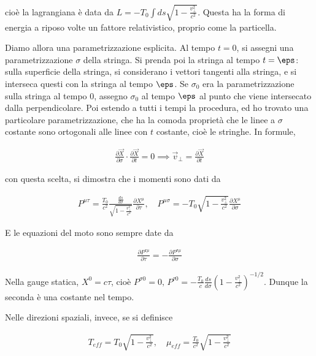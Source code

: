 \documentclass{report}
\begin{document}
cioè la lagrangiana è data da \(L = -T_0\int ds \sqrt{1 - \frac{v_\perp^2}{c^2}}\). Questa ha la forma di energia a riposo volte un fattore relativistico, proprio come la particella. 

Diamo allora una parametrizzazione esplicita. Al tempo \(t=0\), si assegni una parametrizzazione \(\sigma\) della stringa. Si prenda poi la stringa al tempo \(t = \eps\): sulla superficie della stringa, si considerano i vettori tangenti alla stringa, e si interseca questi con la stringa al tempo \(\eps\). Se \(\sigma_0\) era la parametrizzazione sulla stringa al tempo 0, assegno \(\sigma_0\) al tempo \(\eps\) al punto che viene intersecato dalla perpendicolare. Poi estendo a tutti i tempi la procedura, ed ho trovato una particolare parametrizzazione, che ha la comoda proprietà che le linee a \(\sigma\) costante sono ortogonali alle linee con \(t\) costante, cioè le stringhe. In formule, 

\begin{align}
    \frac{\partial \vec{X}}{\partial \sigma}\cdot \frac{\partial \vec{X}}{\partial t} = 0 \implies \vec{v}_\perp = \frac{\partial \vec{X}}{\partial t}
\end{align}

con questa scelta, si dimostra che i momenti sono dati da 

\begin{align}
    P^{\mu \tau } = \frac{T_0}{c^2}\frac{\frac{ds}{d\sigma}}{\sqrt{1 - \frac{v_\perp^2}{c^2}}}\frac{\partial X^\mu}{\partial \tau}, \quad P^{\mu\sigma} = -T_0\sqrt{1 - \frac{v_\perp^2}{c^2}}\frac{\partial X^\mu}{\partial \sigma}
\end{align}

E le equazioni del moto sono sempre date da 

\begin{align}
    \frac{\partial P^{\tau \mu}}{\partial \tau} = - \frac{\partial P^{\sigma\mu}}{\partial \sigma}
\end{align}

Nella gauge statica, \(X^0 = c\tau \), cioè \(P^{\sigma 0} = 0, \, P^{\tau 0} = -\frac{T_0}{c}\frac{ds}{d\sigma}\left(1 - \frac{v_\perp^2}{c^2}\right)^{-1/2}\). Dunque la seconda è una costante nel tempo. 

Nelle direzioni spaziali, invece, se si definisce 

\begin{align}
    T_{eff} = T_0 \sqrt{1 - \frac{v_\perp^2}{c^2}}, \quad \mu_{eff} = \frac{T_0}{c^2}\sqrt{1 - \frac{v_\perp^2}{c^2}}
\end{align}
\end{document}
